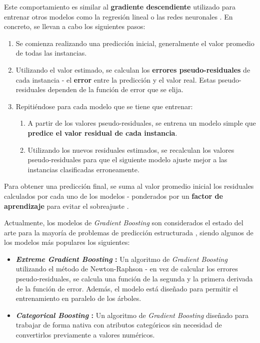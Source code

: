 \begin{itemize}[leftmargin=*, parsep=2pt, itemsep=2pt, topsep=4pt]
	Este comportamiento es similar al \textbf{gradiente descendiente} utilizado para entrenar otros modelos como la regresión lineal o las redes neuronales \cite{Burkov2019TheHM}. En concreto, se llevan a cabo los siguientes pasos:
	\begin{enumerate}[parsep=1pt, itemsep=1pt, topsep=4pt]
		\item Se comienza realizando una predicción inicial, generalmente el valor promedio de todas las instancias.
		\item Utilizando el valor estimado, se calculan los \textbf{errores pseudo-residuales} de cada instancia - el \textbf{error} entre la predicción y el valor real. Estas pseudo-residuales dependen de la función de error que se elija.
		\item Repitiéndose para cada modelo que se tiene que entrenar:
		\begin{enumerate}[parsep=1pt, itemsep=1pt, topsep=4pt]
			\item A partir de los valores pseudo-residuales, se entrena un modelo simple que \textbf{predice el valor residual de cada instancia}.
			\item Utilizando los nuevos residuales estimados, se recalculan los valores pseudo-residuales para que el siguiente modelo ajuste mejor a las instancias clasificadas erroneamente.
		\end{enumerate}
	\end{enumerate}
	
	Para obtener una predicción final, se suma al valor promedio inicial los residuales calculados por cada uno de los modelos - ponderados por un \textbf{factor de aprendizaje} para evitar el sobreajuste \cite{gradientboosting}.
	
	Actualmente, los modelos de \textit{Gradient Boosting} son considerados el estado del arte para la mayoría de problemas de predicción estructurada \cite{Burkov2019TheHM}, siendo algunos de los modelos más populares los siguientes:
	
	\begin{itemize}[parsep=1pt, itemsep=1pt, topsep=4pt]
		\item \textbf{\textit{Extreme Gradient Boosting} \cite{Chen_2016}:} Un algoritmo de \textit{Gradient Boosting} utilizando el método de Newton-Raphson - en vez de calcular los errores pseudo-residuales, se calcula una función de la segunda y la primera derivada de la función de error. Además, el modelo está diseñado para permitir el entrenamiento en paralelo de los árboles.
		\item \textbf{\textit{Categorical Boosting} \cite{dorogush2018catboostgradientboostingcategorical}:} Un algoritmo de \textit{Gradient Boosting} diseñado para trabajar de forma nativa con atributos categóricos sin necesidad de convertirlos previamente a valores numéricos. 
		

\end{itemize}
\end{itemize}
